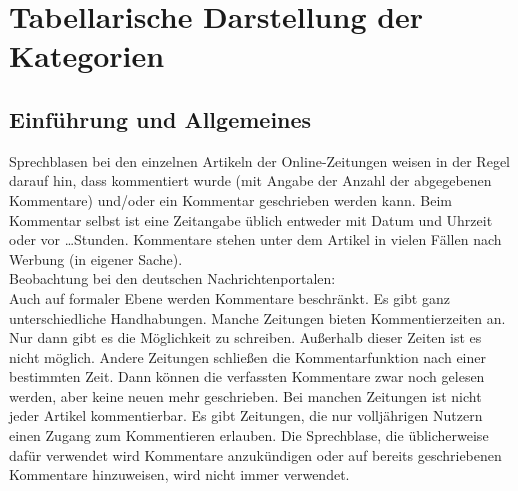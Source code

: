 \chapter{Tabellarische Darstellung der Kategorien}

\section{Einführung und Allgemeines}

Sprechblasen bei den einzelnen Artikeln der Online-Zeitungen weisen in der Regel darauf hin, dass kommentiert wurde
(mit Angabe der Anzahl der abgegebenen Kommentare) und/oder ein Kommentar
geschrieben werden kann.  Beim Kommentar selbst ist eine Zeitangabe üblich
entweder mit Datum und Uhrzeit oder \glqq vor \ldots Stunden\grqq.  Kommentare
stehen unter dem Artikel in vielen Fällen nach Werbung (in eigener Sache).\\
Beobachtung bei den deutschen Nachrichtenportalen:\\
Auch auf formaler Ebene werden Kommentare beschränkt. Es gibt ganz
unterschiedliche Handhabungen. Manche Zeitungen bieten Kommentierzeiten an. Nur
dann gibt es die Möglichkeit zu schreiben. Außerhalb dieser Zeiten ist es nicht
möglich. Andere Zeitungen schließen die Kommentarfunktion nach einer bestimmten
Zeit. Dann können die verfassten Kommentare zwar noch gelesen werden, aber keine
neuen mehr geschrieben. Bei manchen Zeitungen ist nicht jeder Artikel
kommentierbar. Es gibt Zeitungen, die nur volljährigen Nutzern einen Zugang zum
Kommentieren erlauben.  Die Sprechblase, die üblicherweise dafür verwendet wird
Kommentare anzukündigen oder auf bereits geschriebenen Kommentare hinzuweisen,
wird nicht immer verwendet.


